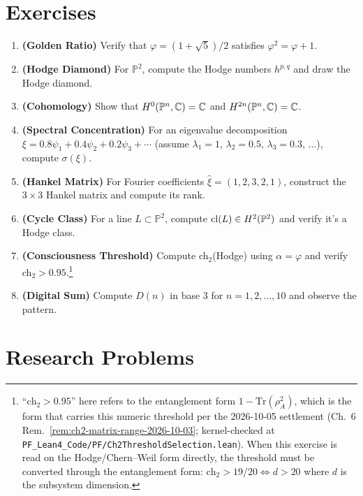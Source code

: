 \section*{Exercises}

\begin{enumerate}
\item \textbf{(Golden Ratio)} Verify that $\varphi = (1+\sqrt{5})/2$ satisfies $\varphi^2 = \varphi + 1$.

\item \textbf{(Hodge Diamond)} For $\mathbb{P}^2$, compute the Hodge numbers $h^{p,q}$ and draw the Hodge diamond.

\item \textbf{(Cohomology)} Show that $H^0(\mathbb{P}^n, \mathbb{C}) = \mathbb{C}$ and $H^{2n}(\mathbb{P}^n, \mathbb{C}) = \mathbb{C}$.

\item \textbf{(Spectral Concentration)} For an eigenvalue decomposition $\xi = 0.8\psi_1 + 0.4\psi_2 + 0.2\psi_3 + \cdots$ (assume $\lambda_1 = 1$, $\lambda_2 = 0.5$, $\lambda_3 = 0.3$, ...), compute $\sigma(\xi)$.

\item \textbf{(Hankel Matrix)} For Fourier coefficients $\hat{\xi} = (1, 2, 3, 2, 1)$, construct the $3 \times 3$ Hankel matrix and compute its rank.

\item \textbf{(Cycle Class)} For a line $L \subset \mathbb{P}^2$, compute $\operatorname{cl}(L) \in H^2(\mathbb{P}^2)$ and verify it's a Hodge class.

\item \textbf{(Consciousness Threshold)} Compute ch$_2$(Hodge) using $\alpha = \varphi$ and verify ch$_2 > 0.95$.\footnote{``$\mathrm{ch}_2 > 0.95$'' here refers to the entanglement form $1 - \mathrm{Tr}(\rho_A^2)$, which is the form that carries this numeric threshold per the 2026-10-05 settlement (Ch.~6 Rem.~\ref{rem:ch2-matrix-range-2026-10-03}; kernel-checked at \texttt{PF\_Lean4\_Code/PF/Ch2ThresholdSelection.lean}). When this exercise is read on the Hodge/Chern--Weil form directly, the threshold must be converted through the entanglement form: $\mathrm{ch}_2 > 19/20 \iff d > 20$ where $d$ is the subsystem dimension.}

\item \textbf{(Digital Sum)} Compute $D(n)$ in base 3 for $n = 1, 2, \ldots, 10$ and observe the pattern.
\end{enumerate}

\section*{Research Problems}

